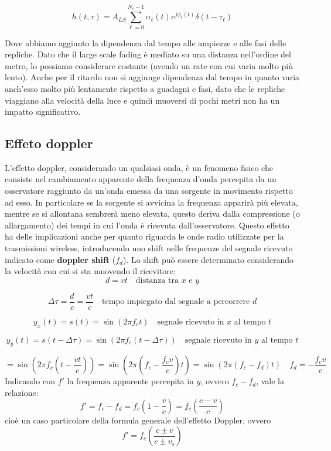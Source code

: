 \[
    h(t, \tau) = A_{LS} \sum_{\ell=0}^{N_c-1} \alpha_{\ell}(t) e^{j\phi_{\ell}(t)} \delta(t - \tau_{\ell})
\]

Dove abbiamo aggiunto la dipendenza dal tempo alle ampiezze e alle fasi delle repliche. Dato che il large scale fading è mediato su una distanza nell'ordine del metro, lo possiamo considerare costante (avendo un rate con cui varia molto più lento).
Anche per il ritardo non si aggiunge dipendenza dal tempo in quanto varia anch'esso molto più lentamente rispetto a guadagni e fasi, dato che le repliche viaggiano alla velocità della luce e quindi muoversi di pochi metri non ha un impatto significativo.






\subsection*{Effeto doppler}
L'effetto doppler, considerando un qualsiasi onda, è un fenomeno fisico che consiste nel cambiamento apparente della frequenza d'onda percepita da un osservatore raggiunto da un'onda emessa da una sorgente in movimento rispetto ad esso.
In particolare se la sorgente si avvicina la frequenza apparirà più elevata, mentre se si allontana sembrerà meno elevata, questo deriva dalla compressione (o allargamento) dei tempi in cui l'onda è ricevuta dall'osservatore.
Questo effetto ha delle implicazioni anche per quanto riguarda le onde radio utilizzate per la trasmissioni wireless, introducendo uno shift nelle frequenze del segnale ricevuto indicato come \textbf{doppler shift} ($f_d$).
Lo shift può essere determinato considerando la velocità con cui si sta muovendo il ricevitore:
\[
    d = vt \quad \text{distanza tra $x$ e $y$}
\]

\[
    \Delta \tau = \frac{d}{c} = \frac{vt}{c} \quad \text{tempo impiegato dal segnale a percorrere $d$}
\]

\[
    y_x(t) = s(t) = \sin(2\pi f_c t) \quad \text{segnale ricevuto in $x$ al tempo $t$}
\]

\[
    y_y(t) = s(t-\Delta \tau) = \sin(2\pi f_c (t-\Delta \tau)) \quad \text{segnale ricevuto in $y$ al tempo $t$}
\]

\[
    = \sin\left(2\pi f_c \left(t - \frac{vt}{c}\right)\right) = \sin\left(2\pi \left(f_c - \frac{f_c v}{c}\right) t\right) = \sin\left(2\pi \left(f_c - f_d \right) t \right) \quad \boxed{f_d = -\frac{f_c v}{c}}
\]
Indicando con $f'$ la frequenza apparente percepita in $y$, ovvero $f_c - f_d$, vale la relazione:
\[
    f' = f_c - f_d = f_c \left(1 - \frac{v}{c}\right) = f_c \left( \frac{c - v}{c} \right)
\]
cioè un caso particolare della formula generale dell'effetto Doppler, ovvero
\[
    f' = f_c \left( \frac{c \pm v}{c \pm v_s} \right)
\]

